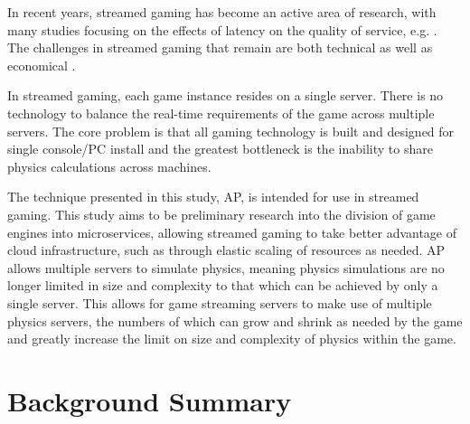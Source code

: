 In recent years, streamed gaming has become an active area of research, with many studies focusing on the effects of latency on the quality of service, e.g. \cite{CloudGamingArchPerf, chen2011measuring, jarschel2011evaluation, lee2012all, StormInCloudGaming, chen2013quality}. The challenges in streamed gaming that remain are both technical as well as economical \cite{2016SurveyOnCloudGaming}.

In streamed gaming, each game instance resides on a single server. There is no technology to balance the real-time requirements of the game across multiple servers. The core problem is that all gaming technology is built and designed for single console/PC install and the greatest bottleneck is the inability to share physics calculations across machines. 

The technique presented in this study, AP, is intended for use in streamed gaming. This study aims to be preliminary research into the division of game engines into microservices, allowing streamed gaming to take better advantage of cloud infrastructure, such as through elastic scaling of resources as needed. 
%
AP allows multiple servers to simulate physics, meaning physics simulations are no longer limited in size and complexity to that which can be achieved by only a single server. This allows for game streaming servers to make use of multiple physics servers, the numbers of which can grow and shrink as needed by the game and greatly increase the limit on size and complexity of physics within the game.

\section{Background Summary}
%

